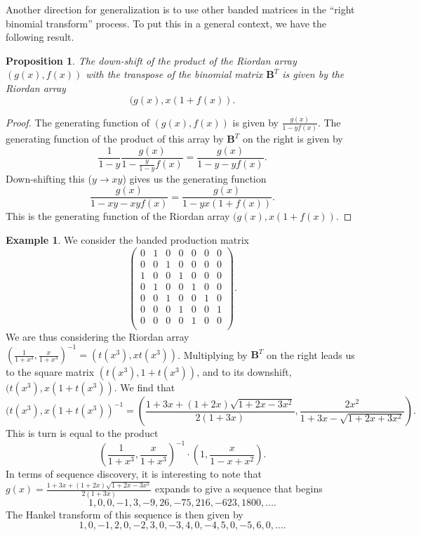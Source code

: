 \documentclass[12pt,reqno]{article}
\newtheorem{proposition}[theorem]{Proposition}
\theoremstyle{definition}
\newtheorem{example}[theorem]{Example}
\begin{document}
Another direction for generalization is to use other banded matrices in the ``right binomial transform'' process. To put this in a general context, we have the following result.
\begin{proposition} The down-shift of the product of the Riordan array $(g(x), f(x))$ with the transpose of the binomial matrix $\mathbf{B}^T$ is given by the Riordan array
$$(g(x), x(1+f(x)).$$
\end{proposition}
\begin{proof}
The generating function of $(g(x), f(x))$ is given by $\frac{g(x)}{1-yf(x)}$. The generating function of the product of this array by $\mathbf{B}^T$ on the right is given by
$$\frac{1}{1-y} \frac{g(x)}{1-\frac{y}{1-y}f(x)}=\frac{g(x)}{1-y-yf(x)}.$$ Down-shifting this ($y\to xy$) gives us the generating function
$$\frac{g(x)}{1-xy-xyf(x)}=\frac{g(x)}{1-yx(1+f(x))}.$$
This is the generating function of the Riordan array $(g(x), x(1+f(x))$.
\end{proof}
\begin{example}
We consider the banded production matrix
$$\left(
\begin{array}{ccccccc}
0 &1 & 0 & 0 & 0 & 0 & 0 \\
0 & 0 & 1 & 0 & 0 & 0 & 0 \\
1 & 0 & 0 & 1 & 0 & 0 & 0 \\
0 & 1 & 0 & 0 & 1 & 0 & 0 \\
0 & 0 & 1 & 0 & 0 & 1 & 0 \\
0 & 0 & 0 & 1 & 0 & 0 & 1 \\
0 & 0 & 0 & 0 & 1 & 0 & 0 \\
\end{array}\right).$$
We are thus considering the Riordan array $\left(\frac{1}{1+x^3}, \frac{x}{1+x^3}\right)^{-1}=(t(x^3), xt(x^3))$.
Multiplying by $\mathbf{B}^T$ on the right leads us to the square matrix $(t(x^3), 1+t(x^3))$, and to its downshift, $(t(x^3), x(1+t(x^3))$. We find that
$$(t(x^3), x(1+t(x^3))^{-1}=\left(\frac{1+3x+(1+2x)\sqrt{1+2x-3x^2}}{2(1+3x)}, \frac{2x^2}{1+3x-\sqrt{1+2x+3x^2}}\right).$$ 
This is turn is equal to the product 
$$\left(\frac{1}{1+x^3}, \frac{x}{1+x^3}\right)^{-1}\cdot \left(1, \frac{x}{1-x+x^2}\right).$$ In terms of sequence discovery, it is interesting to note that
$g(x)=\frac{1+3x+(1+2x)\sqrt{1+2x-3x^2}}{2(1+3x)}$ expands to give a sequence that begins
$$1, 0, 0, -1, 3, -9, 26, -75, 216, -623, 1800,\ldots.$$
The Hankel transform \cite{Layman} of this sequence is then given by
$$1, 0, -1, 2, 0, -2, 3, 0, -3, 4, 0, -4, 5, 0, -5, 6, 0,\ldots.$$
\end{example}
\end{document}
